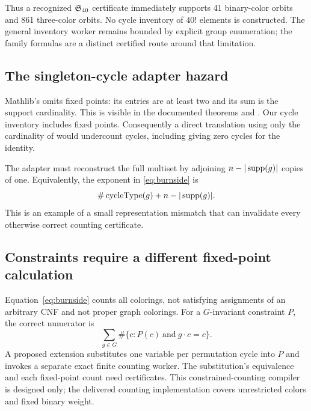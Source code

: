 Thus a recognized $\mathfrak S_{40}$ certificate immediately supports 41 binary-color orbits and 861 three-color orbits. No cycle inventory of $40!$ elements is constructed. The general inventory worker remains bounded by explicit group enumeration; the family formulas are a distinct certified route around that limitation.

\subsection{The singleton-cycle adapter hazard}
Mathlib's  omits fixed points: its entries are at least two and its sum is the support cardinality. This is visible in the documented theorems  and  \cite{mathlib-cycles}. Our cycle inventory includes fixed points. Consequently a direct translation using only the cardinality of  would undercount cycles, including giving zero cycles for the identity.

The adapter must reconstruct the full multiset by adjoining $n-|\operatorname{supp}(g)|$ copies of one. Equivalently, the exponent in \eqref{eq:burnside} is
\[
  \#\operatorname{cycleType}(g)+n-|\operatorname{supp}(g)|.
\]
This is an example of a small representation mismatch that can invalidate every otherwise correct counting certificate.

\subsection{Constraints require a different fixed-point calculation}
Equation~\eqref{eq:burnside} counts all colorings, not satisfying assignments of an arbitrary CNF and not proper graph colorings. For a $G$-invariant constraint $P$, the correct numerator is
\[
  \sum_{g\in G}\#\{c:P(c)\ \text{and}\ g\cdot c=c\}.
\]
A proposed extension substitutes one variable per permutation cycle into $P$ and invokes a separate exact finite counting worker. The substitution's equivalence and each fixed-point count need certificates. This constrained-counting compiler is designed only; the delivered counting implementation covers unrestricted colors and fixed binary weight.
